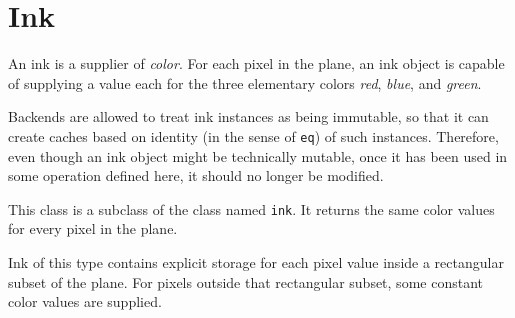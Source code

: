 \chapter{Ink}
\label{chap-ink}


An ink is a supplier of \emph{color}.  For each pixel in the plane, an
ink object is capable of supplying a value each for the three
elementary colors \emph{red}, \emph{blue}, and \emph{green}.

Backends are allowed to treat ink instances as being immutable, so
that it can create caches based on identity (in the sense of
\texttt{eq}) of such instances.  Therefore, even though an ink object
might be technically mutable, once it has been used in some operation
defined here, it should no longer be modified.


This class is a subclass of the class named \texttt{ink}.  It returns
the same color values for every pixel in the plane.


Ink of this type contains explicit storage for each pixel value inside
a rectangular subset of the plane.  For pixels outside that
rectangular subset, some constant color values are supplied.

